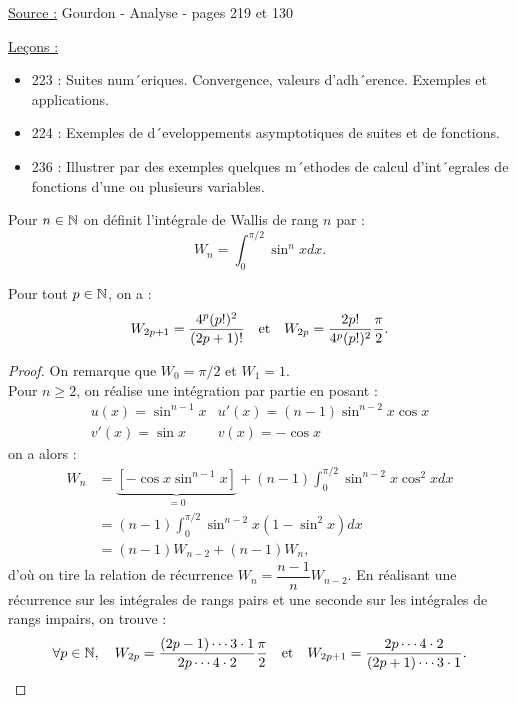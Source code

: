 

\pagestyle{fancy}

\fancyhead[C]{}
\fancyhead[R]{}



\underline{Source :} Gourdon - Analyse - pages 219 et 130

\underline{Leçons :}
\begin{itemize}
\item 223 : Suites num´eriques. Convergence, valeurs d’adh´erence. Exemples et applications.
\item 224 : Exemples de d´eveloppements asymptotiques de suites et de fonctions.
\item 236 : Illustrer par des exemples quelques m´ethodes de calcul d’int´egrales de fonctions d’une ou plusieurs variables.
\end{itemize}

\begin{defn}
Pour $n \in \mathbb{N}$ on définit l'intégrale de Wallis de rang $n$ par :
\[ W_n = \int_{0}^{\pi/2} \sin^n{x} dx . \]
\end{defn}

\begin{lem}
\label{lem:1}
Pour tout $p \in \mathbb{N}$, on a :
\[ W_{2p+1} = \dfrac{4^p (p!)^2}{(2p+1)!} \quad \text{et} \quad W_{2p} = \dfrac{2p!} {4^p (p!)^2} \dfrac{\pi}{2} . \]
\end{lem}

\begin{proof}
On remarque que $W_0 = \pi/2$ et $W_1 = 1$. \\
Pour $n \geq 2$, on réalise une intégration par partie en posant :
\[ \begin{matrix}
u(x) = \sin^{n-1}{x} & u'(x) = (n-1) \sin^{n-2}{x} \cos{x} \\
v'(x) = \sin{x} & v(x) = - \cos{x}
\end{matrix} \]
on a alors :
\begin{align*}
W_n & = \underbrace{ \left[ -\cos{x} \sin^{n-1}{x} \right ]}_{=0} + (n-1) \int_{0}^{\pi/2} \sin^{n-2}{x} \cos^2{x} dx \\
& = (n-1) \int_{0}^{\pi/2} \sin^{n-2}{x} (1-\sin^2{x}) dx \\
& = (n-1) W_{n-2} + (n-1) W_n ,
\end{align*}
d'où on tire la relation de récurrence $W_n = \dfrac{n-1}{n} W_{n-2}$. En réalisant une récurrence sur les intégrales de rangs pairs
et une seconde sur les intégrales de rangs impairs, on trouve :
\[ \forall p \in \mathbb{N}, \quad W_{2p} = \dfrac{(2p-1) \cdots 3 \cdot 1}{2p \cdots 4 \cdot 2} \dfrac{\pi}{2} \quad \text{et} \quad
W_{2p+1} = \dfrac{2p \cdots 4 \cdot 2}{(2p+1) \cdots 3 \cdot 1} . \]
\end{proof}

